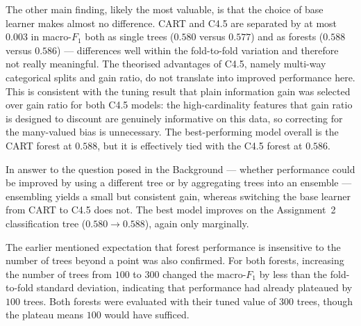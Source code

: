 \documentclass[conference]{IEEEtran}
\begin{document}
The other main finding, likely the most valuable, is that the choice of base learner makes almost no difference. CART and C4.5
are separated by at most $0.003$ in macro-$F_1$ both as single trees ($0.580$ versus $0.577$) and as
forests ($0.588$ versus $0.586$) --- differences well within the fold-to-fold variation and
therefore not really meaningful. The theorised advantages of C4.5, namely multi-way categorical splits and
gain ratio, do not translate into improved performance here. This is consistent with the tuning
result that plain information gain was selected over gain ratio for both C4.5 models: the
high-cardinality features that gain ratio is designed to discount are genuinely informative on this
data, so correcting for the many-valued bias is unnecessary. The best-performing model overall is
the CART forest at $0.588$, but it is effectively tied with the C4.5 forest at $0.586$.

In answer to the question posed in the Background --- whether performance could be improved by using
a different tree or by aggregating trees into an ensemble --- ensembling yields a small but
consistent gain, whereas switching the base learner from CART to C4.5 does not. The best model
improves on the Assignment~2 classification tree ($0.580 \to 0.588$), again only marginally.

The earlier mentioned expectation that forest performance is insensitive to the number of trees beyond
a point was also confirmed. For both forests, increasing the number of trees from $100$ to $300$
changed the macro-$F_1$ by less than the fold-to-fold standard deviation, indicating that
performance had already plateaued by $100$ trees. Both forests were evaluated with their tuned value
of $300$ trees, though the plateau means $100$ would have sufficed.
\end{document}
